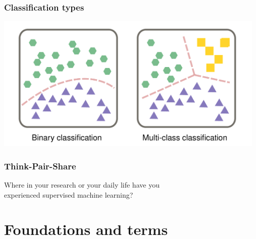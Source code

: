 \documentclass[aspectratio=169]{beamer}
\begin{document}
\begin{frame}
  \frametitle{Classification types}
  \begin{center}
    \includegraphics[width=13cm]{images/binary_vs_multi-class_classification.pdf}
  \end{center}  
\end{frame}

\begin{frame}
  \frametitle{Think-Pair-Share}
  \begin{block}{}
    \begin{center}
      Where in your research or your daily life have you\\
      experienced supervised machine learning?
    \end{center}    
  \end{block}
\end{frame}

\section{Foundations and terms}

\begin{frame}{}
   \tableofcontents[currentsection]
\end{frame}
\end{document}
